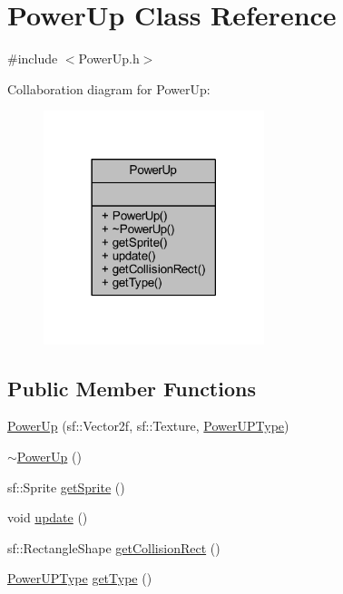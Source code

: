 \hypertarget{class_power_up}{}\section{Power\+Up Class Reference}
\label{class_power_up}


{\ttfamily \#include $<$Power\+Up.\+h$>$}



Collaboration diagram for Power\+Up\+:
\nopagebreak
\begin{figure}[H]
\begin{center}
\leavevmode
\includegraphics[width=182pt]{class_power_up__coll__graph}
\end{center}
\end{figure}
\subsection*{Public Member Functions}
\begin{DoxyCompactItemize}
\item 
\hyperlink{class_power_up_abf0ff839909cf8d07ba12a29b800ae52}{Power\+Up} (sf\+::\+Vector2f, sf\+::\+Texture, \hyperlink{_power_up_type_8h_a5508eb40af0ccc4bb1b781eaf743176c}{Power\+U\+P\+Type})
\item 
\hyperlink{class_power_up_a353053fe27c5a148a2fcd4f5f45e19af}{$\sim$\+Power\+Up} ()
\item 
sf\+::\+Sprite \hyperlink{class_power_up_aba820cd37629518c43f39a7bddbc12f6}{get\+Sprite} ()
\item 
void \hyperlink{class_power_up_ab96271d08f69d68d022a758836f3c5cd}{update} ()
\item 
sf\+::\+Rectangle\+Shape \hyperlink{class_power_up_a4a0eeee44d665fc8878fa2a9a603edd9}{get\+Collision\+Rect} ()
\item 
\hyperlink{_power_up_type_8h_a5508eb40af0ccc4bb1b781eaf743176c}{Power\+U\+P\+Type} \hyperlink{class_power_up_a1772404047e75e3ccaeb8dd9faa20471}{get\+Type} ()
\end{DoxyCompactItemize}


